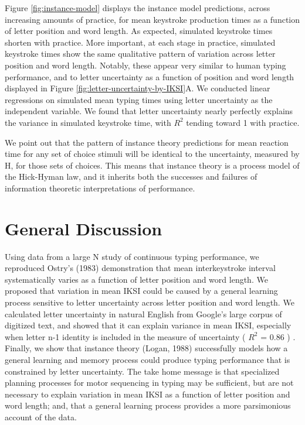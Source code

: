 \documentclass[floatsintext,man]{apa6}
\theoremstyle{definition}
\theoremstyle{definition}
\theoremstyle{definition}
\theoremstyle{remark}
\begin{document}
Figure \ref{fig:instance-model} displays the instance model predictions,
across increasing amounts of practice, for mean keystroke production
times as a function of letter position and word length. As expected,
simulated keystroke times shorten with practice. More important, at each
stage in practice, simulated keystroke times show the same qualitative
pattern of variation across letter position and word length. Notably,
these appear very similar to human typing performance, and to letter
uncertainty as a function of position and word length displayed in
Figure \ref{fig:letter-uncertainty-by-IKSI}A. We conducted linear
regressions on simulated mean typing times using letter uncertainty as
the independent variable. We found that letter uncertainty nearly
perfectly explains the variance in simulated keystroke time, with
\(R^2\) tending toward 1 with practice.

We point out that the pattern of instance theory predictions for mean
reaction time for any set of choice stimuli will be identical to the
uncertainty, measured by H, for those sets of choices. This means that
instance theory is a process model of the Hick-Hyman law, and it
inherits both the successes and failures of information theoretic
interpretations of performance.

\section{General Discussion}\label{general-discussion}

Using data from a large N study of continuous typing performance, we
reproduced Ostry's (1983) demonstration that mean interkeystroke
interval systematically varies as a function of letter position and word
length. We proposed that variation in mean IKSI could be caused by a
general learning process sensitive to letter uncertainty across letter
position and word length. We calculated letter uncertainty in natural
English from Google's large corpus of digitized text, and showed that it
can explain variance in mean IKSI, especially when letter n-1 identity
is included in the measure of uncertainty ( \(R^2\) = 0.86 ) . Finally,
we show that instance theory (Logan, 1988) successfully models how a
general learning and memory process could produce typing performance
that is constrained by letter uncertainty. The take home message is that
specialized planning processes for motor sequencing in typing may be
sufficient, but are not necessary to explain variation in mean IKSI as a
function of letter position and word length; and, that a general
learning process provides a more parsimonious account of the data.
\end{document}
